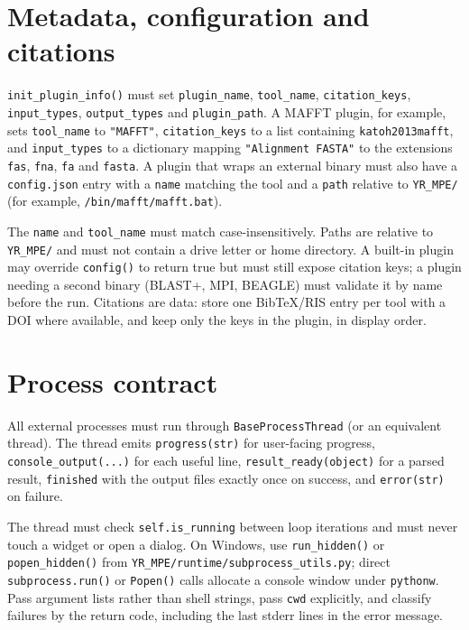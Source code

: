 \documentclass[10pt]{report}
\begin{document}
\section{Metadata, configuration and citations}

\texttt{init\_plugin\_info()} must set \texttt{plugin\_name},
\texttt{tool\_name}, \texttt{citation\_keys}, \texttt{input\_types},
\texttt{output\_types} and \texttt{plugin\_path}. A MAFFT plugin, for example,
sets \texttt{tool\_name} to \texttt{"MAFFT"}, \texttt{citation\_keys} to a
list containing \texttt{katoh2013mafft}, and \texttt{input\_types} to a
dictionary mapping \texttt{"Alignment FASTA"} to the extensions \texttt{fas},
\texttt{fna}, \texttt{fa} and \texttt{fasta}. A plugin that wraps an external
binary must also have a \texttt{config.json} entry with a \texttt{name}
matching the tool and a \texttt{path} relative to \texttt{YR\_MPE/} (for
example, \texttt{/bin/mafft/mafft.bat}).

The \texttt{name} and \texttt{tool\_name} must match case-insensitively.
Paths are relative to \texttt{YR\_MPE/} and must not contain a drive letter or
home directory. A built-in plugin may override \texttt{config()} to return
true but must still expose citation keys; a plugin needing a second binary
(BLAST+, MPI, BEAGLE) must validate it by name before the run. Citations are
data: store one BibTeX/RIS entry per tool with a DOI where available, and keep
only the keys in the plugin, in display order.

\section{Process contract}

All external processes must run through \texttt{BaseProcessThread} (or an
equivalent thread). The thread emits \texttt{progress(str)} for user-facing
progress, \texttt{console\_output(...)} for each useful line,
\texttt{result\_ready(object)} for a parsed result, \texttt{finished} with the
output files exactly once on success, and \texttt{error(str)} on failure.

The thread must check \texttt{self.is\_running} between loop iterations and
must never touch a widget or open a dialog. On Windows, use
\texttt{run\_hidden()} or \texttt{popen\_hidden()} from
\texttt{YR\_MPE/runtime/subprocess\_utils.py}; direct \texttt{subprocess.run()}
or \texttt{Popen()} calls allocate a console window under \texttt{pythonw}.
Pass argument lists rather than shell strings, pass \texttt{cwd} explicitly,
and classify failures by the return code, including the last stderr lines in
the error message.
\end{document}
